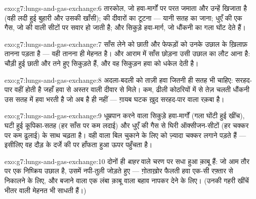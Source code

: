 \begin{solution}{exo:g7:lungs-and-gas-exchange:6}
तारकोल, जो हवा-मार्गों पर परत जमाता और उन्हें खिजाता है (वही लदी हुई
बुहारी और उसकी खाँसी);  की दीवारों का टूटना --- यानी सतह का
जाना; धुएँ की एक गैस, जो  की  वाली सीटों पर सवार हो जाती है;
और सिकुड़े हवा-मार्ग, जो धौंकनी का गला घोंट देते हैं।
\end{solution}

\begin{solution}{exo:g7:lungs-and-gas-exchange:7}
साँस लेने को छाती और फेफड़ों को उनके उछाल के ख़िलाफ़ तानना पड़ता है ---
वही तानना ही मेहनत है। और आराम में साँस छोड़ना उसी उछाल का लौट आना है:
चौड़ी हुई छाती और तने हुए  सिकुड़ते हैं, और वह सिकुड़न हवा को
धकेल देती है।
\end{solution}

\begin{solution}{exo:g7:lungs-and-gas-exchange:8}
अदला-बदली को ताज़ी हवा जितनी ही सतह भी चाहिए: सरहद-पार वहीं होती है
जहाँ हवा  से अस्तर वाली दीवार से मिले। कम, ढीली कोठरियों में से तेज़
चलती धौंकनी उस सतह में हवा भरती है जो अब है ही नहीं --- ग़ायब घटक ख़ुद
सरहद-पार वाला रक़बा है।
\end{solution}

\begin{solution}{exo:g7:lungs-and-gas-exchange:9}
धूम्रपान करने वाला सिकुड़े हवा-मार्गों (गला घोंटी हुई खींच), घटी हुई
कूपिका-सतह (हर साँस पर कम लदाई) और धुएँ की गैस से घिरी ऑक्सीजन-सीटों
(हर चक्कर पर कम ढुलाई) के साथ चढ़ता है। वही  वाला बिल चुकाने के
लिए  को ज़्यादा चक्कर लगाने पड़ते हैं --- इसीलिए वह दौड़ के दर्जे की
 पर हाँफता हुआ ऊपर पहुँचता है।
\end{solution}

\begin{solution}{exo:g7:lungs-and-gas-exchange:10}
दोनों ही \emph{बाहर} वाले चरण पर सधा हुआ क़ाबू हैं: जो आम तौर पर एक
निष्क्रिय उछाल है, उसमें नपी-तुली  जोड़ते हुए --- ग़ोताख़ोर फैलती
हवा एक-सी रफ़्तार से निकालने के लिए, और बजाने वाला एक लंबा क़ाबू वाला
बहाव नापकर देने के लिए। (उनकी गहरी खींचें भीतर वाली मेहनत भी साधती
हैं।)
\end{solution}


